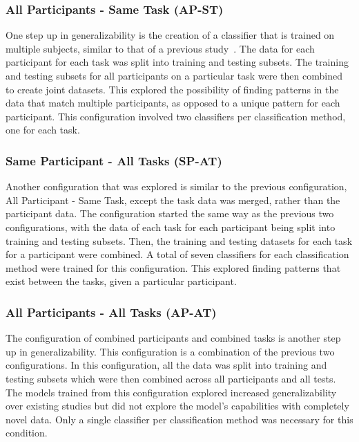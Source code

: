 \documentclass[11pt]{article}
\begin{document}
		\subsubsection{All Participants - Same Task (AP-ST)}
		One step up in generalizability is the creation of a classifier that is trained on multiple subjects, similar to that of a previous study~\cite{Wang_Z}. The data for each participant for each task was split into training and testing subsets. The training and testing subsets for all participants on a particular task were then combined to create joint datasets. This explored the possibility of finding patterns in the data that match multiple participants, as opposed to a unique pattern for each participant. This configuration involved two classifiers per classification method, one for each task.
		
		\subsubsection{Same Participant - All Tasks (SP-AT)}
		Another configuration that was explored is similar to the previous configuration, All Participant - Same Task, except the task data was merged, rather than the participant data. The configuration started the same way as the previous two configurations, with the data of each task for each participant being split into training and testing subsets. Then, the training and testing datasets for each task for a participant were combined. A total of seven classifiers for each classification method were trained for this configuration. This explored finding patterns that exist between the tasks, given a particular participant.
		
		\subsubsection{All Participants - All Tasks (AP-AT)}
		The configuration of combined participants and combined tasks is another step up in generalizability. This configuration is a combination of the previous two configurations. In this configuration, all the data was split into training and testing subsets which were then combined across all participants and all tests. The models trained from this configuration explored increased generalizability over existing studies but did not explore the model's capabilities with completely novel data. Only a single classifier per classification method was necessary for this condition.
		
\end{document}
